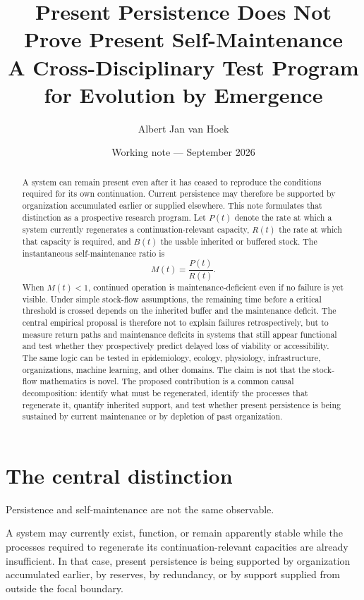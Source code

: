 \documentclass[11pt,a4paper]{article}
\title{\textbf{Present Persistence Does Not Prove Present Self-Maintenance}\\
\large A Cross-Disciplinary Test Program for Evolution by Emergence}
\author{Albert Jan van Hoek}
\date{Working note --- September 2026}
\begin{document}
\maketitle

\begin{abstract}
A system can remain present even after it has ceased to reproduce the conditions required for its own continuation. Current persistence may therefore be supported by organization accumulated earlier or supplied elsewhere. This note formulates that distinction as a prospective research program. Let $P(t)$ denote the rate at which a system currently regenerates a continuation-relevant capacity, $R(t)$ the rate at which that capacity is required, and $B(t)$ the usable inherited or buffered stock. The instantaneous self-maintenance ratio is
\[
M(t)=\frac{P(t)}{R(t)}.
\]
When $M(t)<1$, continued operation is maintenance-deficient even if no failure is yet visible. Under simple stock-flow assumptions, the remaining time before a critical threshold is crossed depends on the inherited buffer and the maintenance deficit. The central empirical proposal is therefore not to explain failures retrospectively, but to measure return paths and maintenance deficits in systems that still appear functional and test whether they prospectively predict delayed loss of viability or accessibility. The same logic can be tested in epidemiology, ecology, physiology, infrastructure, organizations, machine learning, and other domains. The claim is not that the stock-flow mathematics is novel. The proposed contribution is a common causal decomposition: identify what must be regenerated, identify the processes that regenerate it, quantify inherited support, and test whether present persistence is being sustained by current maintenance or by depletion of past organization.
\end{abstract}

\section{The central distinction}

Persistence and self-maintenance are not the same observable.

A system may currently exist, function, or remain apparently stable while the processes required to regenerate its continuation-relevant capacities are already insufficient. In that case, present persistence is being supported by organization accumulated earlier, by reserves, by redundancy, or by support supplied from outside the focal boundary.
\end{document}

